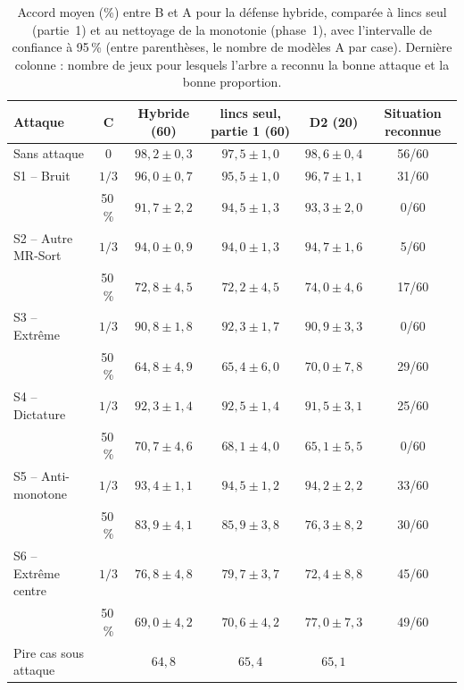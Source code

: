 \documentclass[11pt,a4paper]{article}
\begin{document}
\begin{table}[h]
\centering
\small
\begin{tabularx}{\textwidth}{>{\raggedright\arraybackslash}p{3.3cm}cCCCc}
\toprule
Attaque & C & Hybride (60) & lincs seul, partie 1 (60) & D2 (20) & Situation reconnue \\
\midrule
Sans attaque         & 0       & $98{,}2 \pm 0{,}3$ & $97{,}5 \pm 1{,}0$ & $98{,}6 \pm 0{,}4$ & 56/60 \\
\midrule
S1 -- Bruit          & $1/3$   & $96{,}0 \pm 0{,}7$ & $95{,}5 \pm 1{,}0$ & $96{,}7 \pm 1{,}1$ & 31/60 \\
                     & 50\,\%  & $91{,}7 \pm 2{,}2$ & $94{,}5 \pm 1{,}3$ & $93{,}3 \pm 2{,}0$ & 0/60 \\
S2 -- Autre MR-Sort  & $1/3$   & $94{,}0 \pm 0{,}9$ & $94{,}0 \pm 1{,}3$ & $94{,}7 \pm 1{,}6$ & 5/60 \\
                     & 50\,\%  & $72{,}8 \pm 4{,}5$ & $72{,}2 \pm 4{,}5$ & $74{,}0 \pm 4{,}6$ & 17/60 \\
S3 -- Extrême        & $1/3$   & $90{,}8 \pm 1{,}8$ & $92{,}3 \pm 1{,}7$ & $90{,}9 \pm 3{,}3$ & 0/60 \\
                     & 50\,\%  & $64{,}8 \pm 4{,}9$ & $65{,}4 \pm 6{,}0$ & $70{,}0 \pm 7{,}8$ & 29/60 \\
S4 -- Dictature      & $1/3$   & $92{,}3 \pm 1{,}4$ & $92{,}5 \pm 1{,}4$ & $91{,}5 \pm 3{,}1$ & 25/60 \\
                     & 50\,\%  & $70{,}7 \pm 4{,}6$ & $68{,}1 \pm 4{,}0$ & $65{,}1 \pm 5{,}5$ & 0/60 \\
S5 -- Anti-monotone  & $1/3$   & $93{,}4 \pm 1{,}1$ & $94{,}5 \pm 1{,}2$ & $94{,}2 \pm 2{,}2$ & 33/60 \\
                     & 50\,\%  & $83{,}9 \pm 4{,}1$ & $85{,}9 \pm 3{,}8$ & $76{,}3 \pm 8{,}2$ & 30/60 \\
S6 -- Extrême centre & $1/3$   & $76{,}8 \pm 4{,}8$ & $79{,}7 \pm 3{,}7$ & $72{,}4 \pm 8{,}8$ & 45/60 \\
                     & 50\,\%  & $69{,}0 \pm 4{,}2$ & $70{,}6 \pm 4{,}2$ & $77{,}0 \pm 7{,}3$ & 49/60 \\
\midrule
Pire cas sous attaque &        & $64{,}8$ & $65{,}4$ & $65{,}1$ & \\
\bottomrule
\end{tabularx}
\caption{Accord moyen (\%) entre B et A pour la défense hybride, comparée à lincs seul (partie~1) et au nettoyage
de la monotonie (phase~1), avec l'intervalle de confiance à 95\,\% (entre parenthèses, le nombre de modèles A par
case). Dernière colonne : nombre de jeux pour lesquels l'arbre a reconnu la bonne attaque et la bonne
proportion.}
\label{tab:hybrid}
\end{table}
\end{document}
